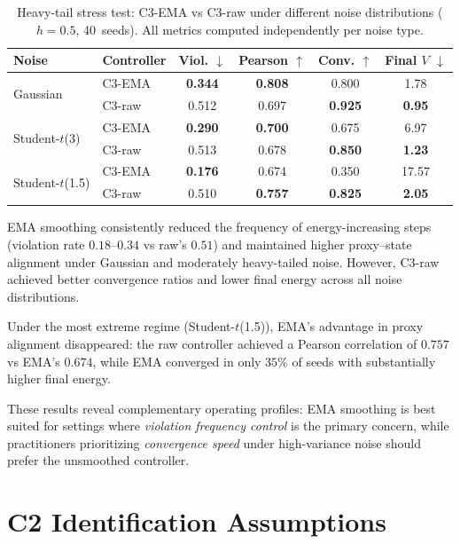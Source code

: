 \documentclass{article}
\begin{document}
\begin{table}[h]
\centering
\caption{Heavy-tail stress test: C3-EMA vs C3-raw under different
  noise distributions ($h{=}0.5$, 40~seeds). All metrics computed
  independently per noise type.}
\label{tab:e3b}
\small
\begin{tabular}{@{}llcccc@{}}
\toprule
\textbf{Noise} & \textbf{Controller}
  & \textbf{Viol.} $\downarrow$ & \textbf{Pearson} $\uparrow$
  & \textbf{Conv.} $\uparrow$ & \textbf{Final $V$} $\downarrow$ \\
\midrule
\multirow{2}{*}{Gaussian}
  & C3-EMA  & \textbf{0.344} & \textbf{0.808} & 0.800 & 1.78 \\
  & C3-raw  & 0.512 & 0.697 & \textbf{0.925} & \textbf{0.95} \\
\midrule
\multirow{2}{*}{Student-$t$(3)}
  & C3-EMA  & \textbf{0.290} & \textbf{0.700} & 0.675 & 6.97 \\
  & C3-raw  & 0.513 & 0.678 & \textbf{0.850} & \textbf{1.23} \\
\midrule
\multirow{2}{*}{Student-$t$(1.5)}
  & C3-EMA  & \textbf{0.176} & 0.674 & 0.350 & 17.57 \\
  & C3-raw  & 0.510 & \textbf{0.757} & \textbf{0.825} & \textbf{2.05} \\
\bottomrule
\end{tabular}
\end{table}

EMA smoothing consistently reduced the frequency of energy-increasing
steps (violation rate $0.18$--$0.34$ vs raw's $0.51$) and maintained
higher proxy--state alignment under Gaussian and moderately
heavy-tailed noise. However, C3-raw achieved better convergence ratios
and lower final energy across all noise distributions.

Under the most extreme regime (Student-$t$(1.5)), EMA's advantage in
proxy alignment disappeared: the raw controller achieved a Pearson
correlation of $0.757$ vs EMA's $0.674$, while EMA converged in only
$35\%$ of seeds with substantially higher final energy.

These results reveal complementary operating profiles: EMA smoothing
is best suited for settings where \emph{violation frequency control}
is the primary concern, while practitioners prioritizing
\emph{convergence speed} under high-variance noise should prefer the
unsmoothed controller.


\section{C2 Identification Assumptions}
\label{sec:assumptions-app}
\end{document}
